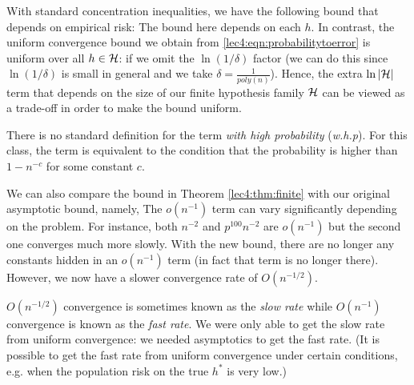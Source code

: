 With standard concentration inequalities, we have the following bound that depends on empirical risk:
The bound here depends on each $h$. In contrast, the uniform convergence bound we obtain from \eqref{lec4:eqn:probabilitytoerror} is uniform over all $h \in \mathcal H$:
if we omit the $\ln{(1/\delta)}$ factor (we can do this since $\ln{(1/\delta)}$ is small in general and we take $\delta = \frac{1}{poly(n)}$). Hence, the extra $\ln{\vert \mathcal H\vert}$ term that depends on the size of our finite hypothesis family $\mathcal H$ can be viewed as a trade-off in order to make the bound uniform.

\begin{remark}
There is no standard definition for the term \textit{with high probability} (\textit{w.h.p}). For this class, the term is equivalent to the condition that the probability is higher than $1 - n^{-c}$ for some constant $c$.
\end{remark}

We can also compare the bound in Theorem \ref{lec4:thm:finite} with our original asymptotic bound, namely,
The $o(n^{-1})$ term can vary significantly depending on the problem. For instance, both $n^{-2}$ and $p^{100}n^{-2}$ are $o(n^{-1})$ but the second one converges much more slowly. With the new bound, there are no longer any constants hidden in an $o(n^{-1})$ term (in fact that term is no longer there). However, we now have a slower convergence rate of $O(n^{-1/2})$.

\begin{remark}
$O(n^{-1/2})$ convergence is sometimes known as the \textit{slow rate} while $O(n^{-1})$ convergence is known as the \textit{fast rate}. We were only able to get the slow rate from uniform convergence: we needed asymptotics to get the fast rate. (It is possible to get the fast rate from uniform convergence under certain conditions, e.g. when the population risk on the true $h^*$ is very low.)
\end{remark}

